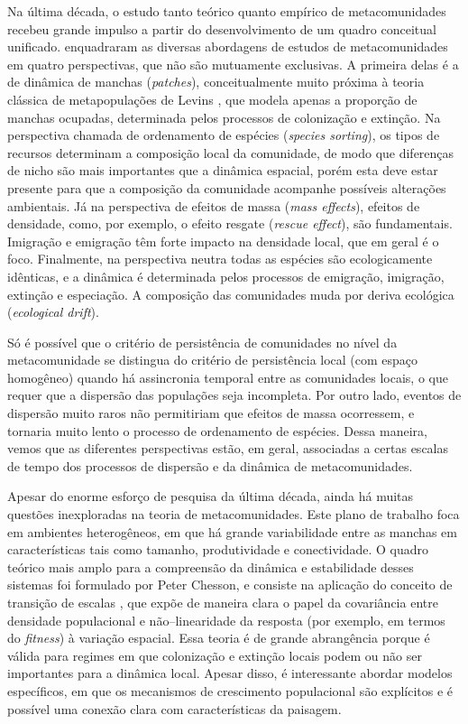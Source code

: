 \documentclass[12pt]{extarticle}
\begin{document}
Na última década, o estudo tanto teórico quanto empírico de metacomunidades
\citep{logue2011} recebeu grande impulso a partir do desenvolvimento de um
quadro conceitual unificado.  \citet{leibold2004} enquadraram as diversas
abordagens de estudos de metacomunidades em quatro perspectivas, que não são
mutuamente exclusivas. A primeira delas é a de dinâmica de manchas
(\emph{patches}), conceitualmente muito próxima à teoria clássica de
metapopulações de Levins \citep{levins1969,levins1971}, que modela apenas
a proporção de manchas ocupadas, determinada pelos processos de colonização
e extinção. Na perspectiva chamada de ordenamento de espécies (\emph{species
sorting}), os tipos de recursos determinam a composição local da comunidade,
de modo que diferenças de nicho são mais importantes que a dinâmica espacial,
porém esta deve estar presente para que a composição da comunidade acompanhe
possíveis alterações ambientais.  Já na perspectiva de efeitos de massa
(\emph{mass effects}), efeitos de densidade, como, por exemplo, o efeito
resgate (\emph{rescue effect}), são fundamentais. Imigração e emigração têm
forte impacto na densidade local, que em geral é o foco.  Finalmente, na
perspectiva neutra todas as espécies são ecologicamente idênticas, e a
dinâmica é determinada pelos processos de emigração, imigração, extinção e
especiação. A composição das comunidades muda por deriva ecológica
(\emph{ecological drift}).

Só é possível que o critério de persistência de comunidades no nível da
metacomunidade se distingua do critério de persistência local (com espaço
homogêneo) quando há assincronia temporal entre as comunidades locais, o que
requer que a dispersão das populações seja incompleta. Por outro lado, eventos
de dispersão muito raros não permitiriam que efeitos de massa ocorressem, e
tornaria muito lento o processo de ordenamento de espécies. Dessa maneira,
vemos que as diferentes perspectivas estão, em geral, associadas a certas
escalas de tempo dos processos de dispersão e da dinâmica de metacomunidades.

Apesar do enorme esforço de pesquisa da última década, ainda há muitas
questões inexploradas na teoria de metacomunidades. Este plano de trabalho
foca em ambientes heterogêneos, em que há grande variabilidade entre as
manchas em características tais como tamanho, produtividade e conectividade. O
quadro teórico mais amplo para a compreensão da dinâmica e estabilidade desses
sistemas foi formulado por Peter Chesson, e consiste na aplicação do conceito
de transição de escalas \citep{chesson1981, chesson1998, chesson2005}, que
expõe de maneira clara o papel da covariância entre densidade populacional e
não--linearidade da resposta (por exemplo, em termos do \emph{fitness}) à
variação espacial. Essa teoria é de grande abrangência porque é válida para
regimes em que colonização e extinção locais podem ou não ser importantes para
a dinâmica local. Apesar disso, é interessante abordar modelos específicos,
em que os mecanismos de crescimento populacional são explícitos e é possível
uma conexão clara com características da paisagem.
\end{document}
